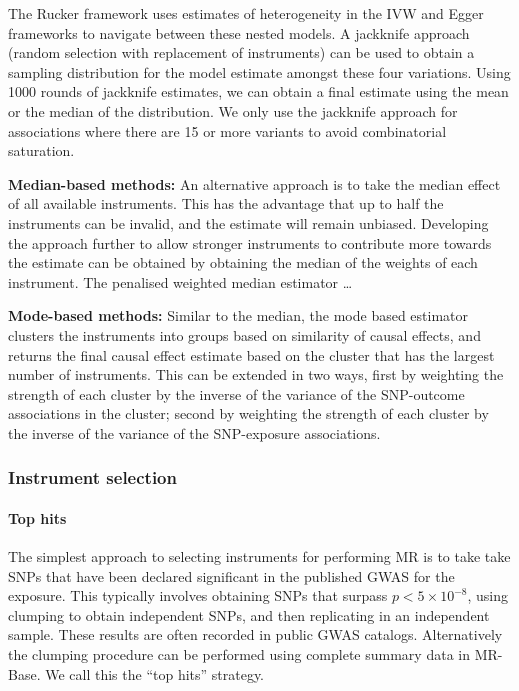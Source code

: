 \documentclass[]{article}
\let\oldparagraph\paragraph
\renewcommand{\paragraph}[1]{\oldparagraph{#1}\mbox{}}
\begin{document}
The Rucker framework uses estimates of heterogeneity in the IVW and
Egger frameworks to navigate between these nested models. A jackknife
approach (random selection with replacement of instruments) can be used
to obtain a sampling distribution for the model estimate amongst these
four variations. Using 1000 rounds of jackknife estimates, we can obtain
a final estimate using the mean or the median of the distribution. We
only use the jackknife approach for associations where there are 15 or
more variants to avoid combinatorial saturation.

\textbf{Median-based methods:} An alternative approach is to take the
median effect of all available instruments. This has the advantage that
up to half the instruments can be invalid, and the estimate will remain
unbiased. Developing the approach further to allow stronger instruments
to contribute more towards the estimate can be obtained by obtaining the
median of the weights of each instrument. The penalised weighted median
estimator \ldots{}

\textbf{Mode-based methods:} Similar to the median, the mode based
estimator clusters the instruments into groups based on similarity of
causal effects, and returns the final causal effect estimate based on
the cluster that has the largest number of instruments. This can be
extended in two ways, first by weighting the strength of each cluster by
the inverse of the variance of the SNP-outcome associations in the
cluster; second by weighting the strength of each cluster by the inverse
of the variance of the SNP-exposure associations.

\subsubsection{Instrument selection}\label{instrument-selection}

\paragraph{Top hits}\label{top-hits}

The simplest approach to selecting instruments for performing MR is to
take take SNPs that have been declared significant in the published GWAS
for the exposure. This typically involves obtaining SNPs that surpass
\(p < 5 \times 10^{-8}\), using clumping to obtain independent SNPs, and
then replicating in an independent sample. These results are often
recorded in public GWAS catalogs. Alternatively the clumping procedure
can be performed using complete summary data in MR-Base. We call this
the ``top hits'' strategy.
\end{document}
